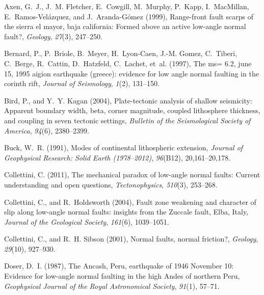 \documentclass[twocolumn,grl]{AGUTeX}
\begin{document}
\begin{article}
\begin{thebibliography}{30}
Axen, G.~J., J.~M. Fletcher, E.~Cowgill, M.~Murphy, P.~Kapp, I.~MacMillan,
  E.~Ramos-Vel{\'a}zquez, and J.~Aranda-G{\'o}mez (1999), Range-front fault
  scarps of the sierra el mayor, baja california: Formed above an active
  low-angle normal fault?, \textit{Geology}, \textit{27}(3), 247--250.

Bernard, P., P.~Briole, B.~Meyer, H.~Lyon-Caen, J.-M. Gomez, C.~Tiberi,
  C.~Berge, R.~Cattin, D.~Hatzfeld, C.~Lachet, et~al. (1997), The ms= 6.2, june
  15, 1995 aigion earthquake (greece): evidence for low angle normal faulting
  in the corinth rift, \textit{Journal of Seismology}, \textit{1}(2), 131--150.

Bird, P., and Y.~Y. Kagan (2004), Plate-tectonic analysis of shallow
  seismicity: Apparent boundary width, beta, corner magnitude, coupled
  lithosphere thickness, and coupling in seven tectonic settings,
  \textit{Bulletin of the Seismological Society of America}, \textit{94}(6),
  2380--2399.

Buck, W.~R. (1991), Modes of continental lithospheric extension,
  \textit{Journal of Geophysical Research: Solid Earth (1978--2012)},
  \textit{96}(B12), 20,161--20,178.

Collettini, C. (2011), The mechanical paradox of low-angle normal faults:
  Current understanding and open questions, \textit{Tectonophysics},
  \textit{510}(3), 253--268.

Collettini, C., and R.~Holdsworth (2004), Fault zone weakening and character of
  slip along low-angle normal faults: insights from the {Z}uccale fault,
  {E}lba, {I}taly, \textit{Journal of the Geological Society}, \textit{161}(6),
  1039--1051.

Collettini, C., and R.~H. Sibson (2001), Normal faults, normal friction?,
  \textit{Geology}, \textit{29}(10), 927--930.

	Doser, D.~I. (1987), The {A}ncash, {P}eru, earthquake of 1946 {N}ovember
10: Evidence for low-angle normal faulting in the high {A}ndes of northern
	{P}eru, \textit{Geophysical Journal of the Royal Astronomical Society},
	\textit{91}(1), 57--71.


\end{thebibliography}
\end{article}
\end{document}
